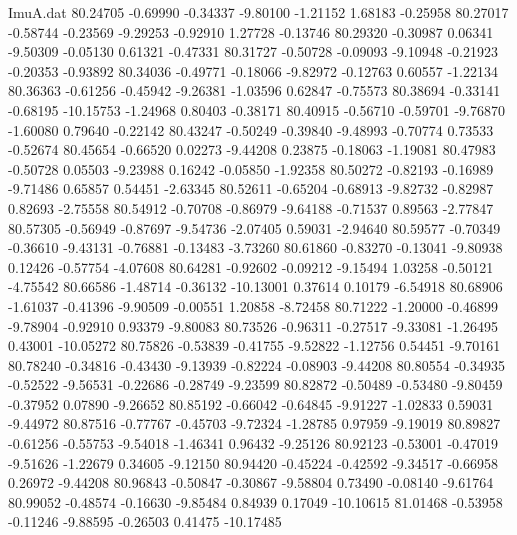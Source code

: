 \begin{filecontents}{ImuA.dat}
  80.24705   -0.69990   -0.34337   -9.80100   -1.21152    1.68183   -0.25958
  80.27017   -0.58744   -0.23569   -9.29253   -0.92910    1.27728   -0.13746
  80.29320   -0.30987    0.06341   -9.50309   -0.05130    0.61321   -0.47331
  80.31727   -0.50728   -0.09093   -9.10948   -0.21923   -0.20353   -0.93892
  80.34036   -0.49771   -0.18066   -9.82972   -0.12763    0.60557   -1.22134
  80.36363   -0.61256   -0.45942   -9.26381   -1.03596    0.62847   -0.75573
  80.38694   -0.33141   -0.68195  -10.15753   -1.24968    0.80403   -0.38171
  80.40915   -0.56710   -0.59701   -9.76870   -1.60080    0.79640   -0.22142
  80.43247   -0.50249   -0.39840   -9.48993   -0.70774    0.73533   -0.52674
  80.45654   -0.66520    0.02273   -9.44208    0.23875   -0.18063   -1.19081
  80.47983   -0.50728    0.05503   -9.23988    0.16242   -0.05850   -1.92358
  80.50272   -0.82193   -0.16989   -9.71486    0.65857    0.54451   -2.63345
  80.52611   -0.65204   -0.68913   -9.82732   -0.82987    0.82693   -2.75558
  80.54912   -0.70708   -0.86979   -9.64188   -0.71537    0.89563   -2.77847
  80.57305   -0.56949   -0.87697   -9.54736   -2.07405    0.59031   -2.94640
  80.59577   -0.70349   -0.36610   -9.43131   -0.76881   -0.13483   -3.73260
  80.61860   -0.83270   -0.13041   -9.80938    0.12426   -0.57754   -4.07608
  80.64281   -0.92602   -0.09212   -9.15494    1.03258   -0.50121   -4.75542
  80.66586   -1.48714   -0.36132  -10.13001    0.37614    0.10179   -6.54918
  80.68906   -1.61037   -0.41396   -9.90509   -0.00551    1.20858   -8.72458
  80.71222   -1.20000   -0.46899   -9.78904   -0.92910    0.93379   -9.80083
  80.73526   -0.96311   -0.27517   -9.33081   -1.26495    0.43001  -10.05272
  80.75826   -0.53839   -0.41755   -9.52822   -1.12756    0.54451   -9.70161
  80.78240   -0.34816   -0.43430   -9.13939   -0.82224   -0.08903   -9.44208
  80.80554   -0.34935   -0.52522   -9.56531   -0.22686   -0.28749   -9.23599
  80.82872   -0.50489   -0.53480   -9.80459   -0.37952    0.07890   -9.26652
  80.85192   -0.66042   -0.64845   -9.91227   -1.02833    0.59031   -9.44972
  80.87516   -0.77767   -0.45703   -9.72324   -1.28785    0.97959   -9.19019
  80.89827   -0.61256   -0.55753   -9.54018   -1.46341    0.96432   -9.25126
  80.92123   -0.53001   -0.47019   -9.51626   -1.22679    0.34605   -9.12150
  80.94420   -0.45224   -0.42592   -9.34517   -0.66958    0.26972   -9.44208
  80.96843   -0.50847   -0.30867   -9.58804    0.73490   -0.08140   -9.61764
  80.99052   -0.48574   -0.16630   -9.85484    0.84939    0.17049  -10.10615
  81.01468   -0.53958   -0.11246   -9.88595   -0.26503    0.41475  -10.17485

\end{filecontents}
